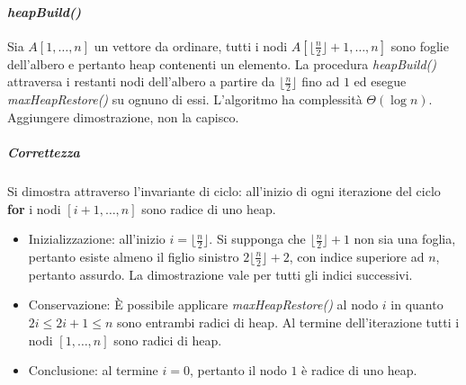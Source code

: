 \paragraph{\emph{heapBuild()}}
Sia $A[1,\dots, n]$ un vettore da ordinare, tutti i nodi $A[\lfloor \frac{n}{2}\rfloor+1,\dots, n]$ sono foglie dell'albero e pertanto heap contenenti un 
elemento. La procedura \emph{heapBuild()} attraversa i restanti nodi dell'albero a partire da $\lfloor \frac{n}{2}\rfloor$ fino ad $1$ ed esegue 
\emph{maxHeapRestore()} su ognuno di essi. L'algoritmo ha complessit\`a $\Theta(\log n)$. Aggiungere dimostrazione, non la capisco.
\begin{algorithm}
\DontPrintSemicolon
{}
\caption{\protect{}}

\end{algorithm}
\subparagraph{Correttezza}
Si dimostra attraverso l'invariante di ciclo: all'inizio di ogni iterazione del ciclo \textbf{for} i nodi $[i+1,\dots, n]$ sono radice di uno heap.
\begin{itemize}
\item Inizializzazione: all'inizio $i=\lfloor \frac{n}{2}\rfloor$. Si supponga che $\lfloor \frac{n}{2}\rfloor+1$ non sia una foglia, pertanto esiste almeno
il figlio sinistro $2\lfloor \frac{n}{2}\rfloor+2$, con indice superiore ad $n$, pertanto assurdo. La dimostrazione vale per tutti gli indici successivi.
\item Conservazione: \`E possibile applicare \emph{maxHeapRestore()} al nodo $i$ in quanto $2i\le 2i+1\le n$ sono entrambi radici di heap. Al termine 
dell'iterazione tutti i nodi $[1,\dots, n]$ sono radici di heap.
\item Conclusione: al termine $i=0$, pertanto il nodo $1$ \`e radice di uno heap. 
\end{itemize}
